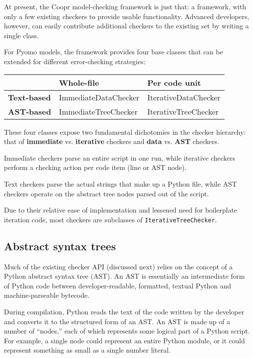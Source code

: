 \documentclass{article}
\begin{document}
At present, the Coopr model-checking framework is just that: a framework, with only a few existing checkers to provide usable functionality. Advanced developers, however, can easily contribute additional checkers to the existing set by writing a single class.

For Pyomo models, the framework provides four base classes that can be extended for different error-checking strategies:

\begin{tabular}{p{1in} | p{2in} | p{2in}}
& \textbf{Whole-file} & \textbf{Per code unit} \\ \hline
\textbf{Text-based} & ImmediateDataChecker & IterativeDataChecker \\ \hline
\textbf{AST-based} & ImmediateTreeChecker & IterativeTreeChecker
\end{tabular}

\noindent These four classes expose two fundamental dichotomies in the checker hierarchy: that of \textbf{immediate} vs. \textbf{iterative} checkers and \textbf{data} vs. \textbf{AST} checkers. 

\begin{itemize*}
\item Immediate checkers parse an entire script in one run, while iterative checkers perform a checking action per code item (line or AST node).
\item Text checkers parse the actual strings that make up a Python file, while AST checkers operate on the abstract tree nodes parsed out of the script.
\end{itemize*}

Due to their relative ease of implementation and lessened need for boilerplate iteration code, most checkers are subclasses of \verb!IterativeTreeChecker!.

\subsection*{Abstract syntax trees}
Much of the existing checker API (discussed next) relies on the concept of a Python abstract syntax tree (AST). An AST is essentially an intermediate form of Python code between developer-readable, formatted, textual Python and machine-parseable bytecode.

During compilation, Python reads the text of the code written by the developer and converts it to the structured form of an AST. An AST is made up of a number of ``nodes,'' each of which represents some logical part of a Python script. For example, a single node could represent an entire Python module, or it could represent something as small as a single number literal.
\end{document}
